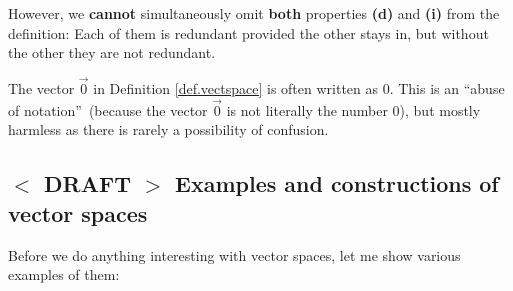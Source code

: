 \documentclass[numbers=enddot,12pt,final,onecolumn,notitlepage]{scrartcl}%
\theoremstyle{definition}
\begin{document}
However, we \textbf{cannot} simultaneously omit \textbf{both} properties
\textbf{(d)} and \textbf{(i)} from the definition: Each of them is redundant
provided the other stays in, but without the other they are not redundant.

The vector $\overrightarrow{0}$ in Definition \ref{def.vectspace} is often
written as $0$. This is an \textquotedblleft abuse of
notation\textquotedblright\ (because the vector $\overrightarrow{0}$ is not
literally the number $0$), but mostly harmless as there is rarely a
possibility of confusion.

\subsection{%
$<$%
DRAFT%
$>$
Examples and constructions of vector spaces}

Before we do anything interesting with vector spaces, let me show various
examples of them:
\end{document}
